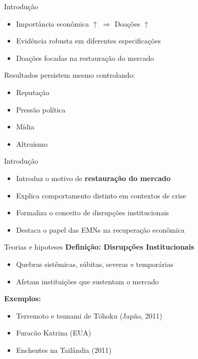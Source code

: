 \documentclass[
  10pt,
  ignorenonframetext,
  aspectratio=169,
  brazilian,
]{beamer}
\providecommand{\tightlist}{%
  \setlength{\itemsep}{0pt}\setlength{\parskip}{0pt}}
\begin{document}
\begin{frame}{Introdução}
\label{introduuxe7uxe3o-7}
\begin{itemize}
\tightlist
\item
  Importância econômica \(\uparrow\) \(\Rightarrow\) Doações
  \(\uparrow\)
\item
  Evidência robusta em diferentes especificações
\item
  Doações focadas na restauração do mercado
\end{itemize}

Resultados persistem mesmo controlando:

\begin{itemize}
\tightlist
\item
  Reputação
\item
  Pressão política
\item
  Mídia
\item
  Altruísmo
\end{itemize}
\end{frame}

\begin{frame}{Introdução}
\label{introduuxe7uxe3o-8}
\begin{itemize}
\tightlist
\item
  Introduz o motivo de \textbf{restauração do mercado}
\item
  Explica comportamento distinto em contextos de crise
\item
  Formaliza o conceito de disrupções institucionais
\item
  Destaca o papel das EMNs na recuperação econômica
\end{itemize}
\end{frame}

\begin{frame}{Teorias e hipoteses}
\label{teorias-e-hipoteses}
\textbf{Definição: Disrupções Institucionais}

\begin{itemize}
\tightlist
\item
  Quebras sistêmicas, súbitas, severas e temporárias
\item
  Afetam instituições que sustentam o mercado
\end{itemize}

\textbf{Exemplos:}

\begin{itemize}
\tightlist
\item
  Terremoto e tsunami de Tōhoku (Japão, 2011)
\item
  Furacão Katrina (EUA)
\item
  Enchentes na Tailândia (2011)
\end{itemize}
\end{frame}
\end{document}
